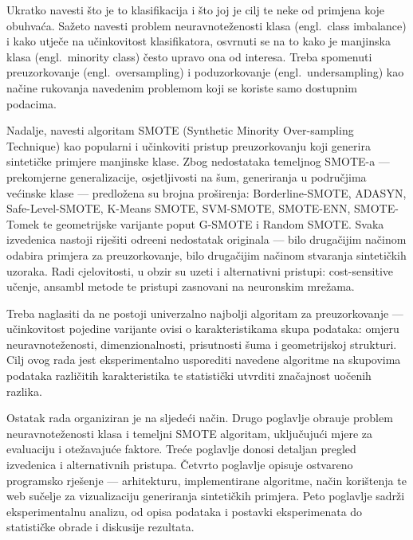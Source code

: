 
Ukratko navesti \v{s}to je to klasifikacija i \v{s}to joj je cilj te
neke od primjena koje obuhva\'{c}a. Sa\v{z}eto navesti problem
neuravnote\v{z}enosti klasa (engl.\ class imbalance) i kako utje\v{c}e
na u\v{c}inkovitost klasifikatora, osvrnuti se na to kako je manjinska
klasa (engl.\ minority class) \v{c}esto upravo ona od interesa. Treba
spomenuti preuzorkovanje (engl.\ oversampling) i poduzorkovanje (engl.\
undersampling) kao na\v{c}ine rukovanja navedenim problemom koji se
koriste samo dostupnim podacima.

Nadalje, navesti algoritam SMOTE (Synthetic Minority Over-sampling
Technique) kao popularni i u\v{c}inkoviti pristup preuzorkovanju koji
generira sinteti\v{c}ke primjere manjinske klase. Zbog nedostataka
temeljnog SMOTE-a --- prekomjerne generalizacije, osjetljivosti na
\v{s}um, generiranja u podru\v{c}jima ve\'{c}inske klase --- predlo\v{z}ena
su brojna pro\v{s}irenja: Borderline-SMOTE, ADASYN, Safe-Level-SMOTE,
K-Means SMOTE, SVM-SMOTE, SMOTE-ENN, SMOTE-Tomek te geometrijske
varijante poput G-SMOTE i Random SMOTE. Svaka izvedenica nastoji
rije\v{s}iti odre\dj{}eni nedostatak originala --- bilo druga\v{c}ijim
na\v{c}inom odabira primjera za preuzorkovanje, bilo druga\v{c}ijim
na\v{c}inom stvaranja sinteti\v{c}kih uzoraka. Radi cjelovitosti,
u obzir su uzeti i alternativni pristupi: cost-sensitive u\v{c}enje,
ansambl metode te pristupi zasnovani na neuronskim mre\v{z}ama.

Treba naglasiti da ne postoji univerzalno najbolji algoritam za
preuzorkovanje --- u\v{c}inkovitost pojedine varijante ovisi o
karakteristikama skupa podataka: omjeru neuravnote\v{z}enosti,
dimenzionalnosti, prisutnosti \v{s}uma i geometrijskoj strukturi. Cilj
ovog rada jest eksperimentalno usporediti navedene algoritme na
skupovima podataka razli\v{c}itih karakteristika te statisti\v{c}ki
utvrditi zna\v{c}ajnost uo\v{c}enih razlika.

Ostatak rada organiziran je na sljede\'{c}i na\v{c}in. Drugo poglavlje
obra\dj{}uje problem neuravnote\v{z}enosti klasa i temeljni SMOTE
algoritam, uklju\v{c}uju\'{c}i mjere za evaluaciju i ote\v{z}avaju\'{c}e
faktore. Tre\'{c}e poglavlje donosi detaljan pregled izvedenica i
alternativnih pristupa. \v{C}etvrto poglavlje opisuje ostvareno
programsko rje\v{s}enje --- arhitekturu, implementirane algoritme,
na\v{c}in kori\v{s}tenja te web su\v{c}elje za vizualizaciju
generiranja sinteti\v{c}kih primjera. Peto poglavlje sadr\v{z}i
eksperimentalnu analizu, od opisa podataka i postavki eksperimenata
do statisti\v{c}ke obrade i diskusije rezultata.
